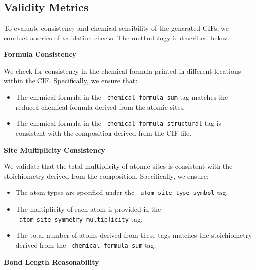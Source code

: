 \subsection{Validity Metrics}\label{sup-sec:validity}

To evaluate consistency and chemical sensibility of the generated CIFs, we conduct a series of validation checks. The methodology is described below. 

\textbf{Formula Consistency}

We check for consistency in the chemical formula printed in different locations within the CIF. Specifically, we ensure that:
\begin{itemize}
    \item The chemical formula in the \texttt{\_chemical\_formula\_sum} tag matches the reduced chemical formula derived from the atomic sites.
    \item The chemical formula in the \texttt{\_chemical\_formula\_structural} tag is consistent with the composition derived from the CIF file.
\end{itemize}

\textbf{Site Multiplicity Consistency}

We validate that the total multiplicity of atomic sites is consistent with the stoichiometry derived from the composition. Specifically, we ensure:
\begin{itemize}
    \item The atom types are specified under the \texttt{\_atom\_site\_type\_symbol} tag.
    \item The multiplicity of each atom is provided in the \texttt{\_atom\_site\_symmetry\_multiplicity} tag.
    \item The total number of atoms derived from these tags matches the stoichiometry derived from the \texttt{\_chemical\_formula\_sum} tag.
\end{itemize}

\textbf{Bond Length Reasonability}


